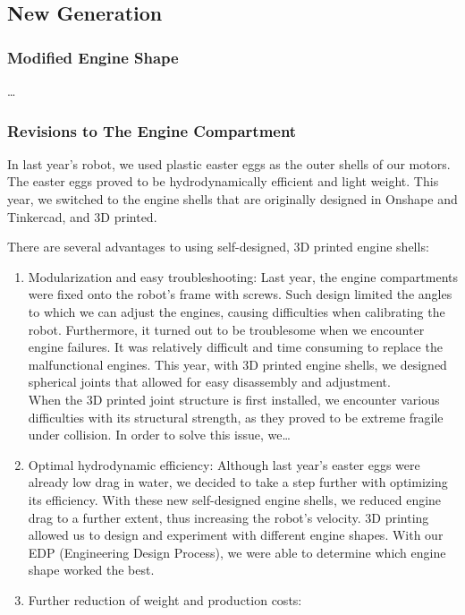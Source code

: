 \documentclass[11pt, oneside]{article}   	%
\begin{document}
\subsection{New Generation}
\subsubsection*{Modified Engine Shape}
\dots
\subsubsection*{Revisions to The Engine Compartment}
In last year’s robot, we used plastic easter eggs as the outer shells of our motors. The easter eggs proved to be hydrodynamically efficient and light weight. This year, we switched to the engine shells that are originally designed in Onshape and Tinkercad, and 3D printed.
\begin{center}
	There are several advantages to using self-designed, 3D printed engine shells:
\end{center}
\begin{enumerate}
	\item Modularization and easy troubleshooting: Last year, the engine compartments were fixed onto the robot’s frame with screws. Such design limited the angles to which we can adjust the engines, causing difficulties when calibrating the robot. Furthermore, it turned out to be troublesome when we encounter engine failures. It was relatively difficult and time consuming to replace the malfunctional engines. This year, with 3D printed engine shells, we designed spherical joints that allowed for easy disassembly and adjustment.
	\\When the 3D printed joint structure is first installed, we encounter various difficulties with its structural strength, as they proved to be extreme fragile under collision. In order to solve this issue, we…

	\item Optimal hydrodynamic efficiency: Although last year’s easter eggs were already low drag in water, we decided to take a step further with optimizing its efficiency. With these new self-designed engine shells, we reduced engine drag to a further extent, thus increasing the robot’s velocity. 3D printing allowed us to design and experiment with different engine shapes. With our EDP (Engineering Design Process), we were able to determine which engine shape worked the best.

	\item Further reduction of weight and production costs:

\end{enumerate}
\end{document}
